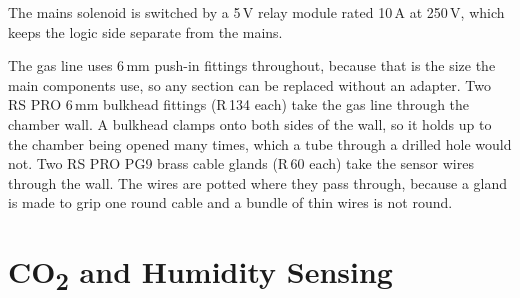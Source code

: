 The mains solenoid is switched by a 5\,V relay module rated 10\,A at 250\,V, which keeps the logic side separate from the mains.

The gas line uses 6\,mm push-in fittings throughout, because that is the size the main components use, so any section can be replaced without an adapter. Two RS PRO 6\,mm bulkhead fittings (R\,134 each) take the gas line through the chamber wall. A bulkhead clamps onto both sides of the wall, so it holds up to the chamber being opened many times, which a tube through a drilled hole would not. Two RS PRO PG9 brass cable glands (R\,60 each) take the sensor wires through the wall. The wires are potted where they pass through, because a gland is made to grip one round cable and a bundle of thin wires is not round.

\section{CO\textsubscript{2} and Humidity Sensing}
\label{app:co2-sensor-options}


